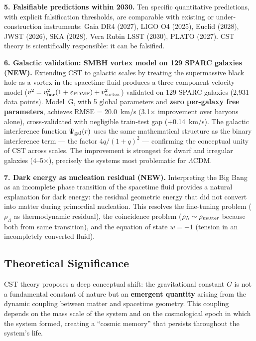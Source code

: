 \documentclass[10pt,a4paper]{article}
\begin{document}
\textbf{5. Falsifiable predictions within 2030.} Ten specific
quantitative predictions, with explicit falsification thresholds, are
comparable with existing or under-construction instruments: Gaia DR4
(2027), LIGO O4 (2025), Euclid (2028), JWST (2026), SKA (2028), Vera
Rubin LSST (2030), PLATO (2027). CST theory is scientifically
responsible: it can be falsified.

\textbf{6. Galactic validation: SMBH vortex model on 129 SPARC galaxies (NEW).}
Extending CST to galactic scales by treating the supermassive black hole as a vortex in the spacetime fluid produces a three-component velocity model ($v^2 = v_{\rm bar}^2(1 + \varepsilon_{\rm PDMF}) + v_{\rm vortex}^2$) validated on 129 SPARC galaxies (2{,}931 data points). Model~G, with 5 global parameters and \textbf{zero per-galaxy free parameters}, achieves RMSE = 20.0~km/s (3.1$\times$ improvement over baryons alone), cross-validated with negligible train-test gap (+0.14~km/s). The galactic interference function $\Psi_{\rm gal}(r)$ uses the same mathematical structure as the binary interference term --- the factor $4q/(1+q)^2$ --- confirming the conceptual unity of CST across scales. The improvement is strongest for dwarf and irregular galaxies (4--5$\times$), precisely the systems most problematic for $\Lambda$CDM.

\textbf{7. Dark energy as nucleation residual (NEW).}
Interpreting the Big Bang as an incomplete phase transition of the spacetime fluid provides a natural explanation for dark energy: the residual geometric energy that did not convert into matter during primordial nucleation. This resolves the fine-tuning problem ($\rho_\Lambda$ as thermodynamic residual), the coincidence problem ($\rho_\Lambda \sim \rho_{\rm matter}$ because both from same transition), and the equation of state $w = -1$ (tension in an incompletely converted fluid).

\subsection{Theoretical
Significance}\label{theoretical-significance}

CST theory proposes a deep conceptual shift: the gravitational constant
\(G\) is not a fundamental constant of nature but an \textbf{emergent
quantity} arising from the dynamic coupling between matter and spacetime
geometry. This coupling depends on the mass scale of the system and on
the cosmological epoch in which the system formed, creating a ``cosmic
memory'' that persists throughout the system's life.
\end{document}
